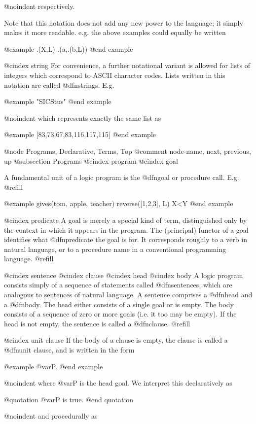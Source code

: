 {@noindent
respectively.

Note that this notation does not add any new power to the language; it
simply makes it more readable.  e.g. the above examples could equally be
written

@example
.(X,L)    .(a,.(b,L))
@end example

@cindex string
For convenience, a further notational variant is allowed for lists of
integers which correspond to ASCII character codes.  Lists written in this
notation are called @dfn{strings}.  E.g.

@example
"SICStus"
@end example

@noindent
which represents exactly the same list as 

@example
[83,73,67,83,116,117,115]
@end example

@node Programs, Declarative, Terms, Top
@comment  node-name,  next,  previous,  up
@subsection Programs
@cindex program
@cindex goal

A fundamental unit of a logic program is the @dfn{goal} or procedure call.
E.g. @refill

@example
gives(tom, apple, teacher)   reverse([1,2,3], L)   X<Y
@end example

@cindex predicate
A goal is merely a special kind of term, distinguished only by the
context in which it appears in the program.  The (principal) functor of
a goal identifies what @dfn{predicate} the goal is for.  It corresponds
roughly to a verb in natural language, or to a procedure name in a
conventional programming language. @refill

@cindex sentence
@cindex clause
@cindex head
@cindex body
A logic program consists simply of a sequence of statements called
@dfn{sentences}, which are analogous to sentences of natural language.  A
sentence comprises a @dfn{head} and a @dfn{body}.  The head either consists
of a single goal or is empty.  The body consists of a sequence of zero or
more goals (i.e. it too may be empty).  If the head is not empty, the
sentence is called a @dfn{clause}. @refill

@cindex unit clause
If the body of a clause is empty, the clause is called a @dfn{unit
clause}, and is written in the form

@example
@var{P}.
@end example

@noindent
where @var{P} is the head goal.  We interpret this declaratively as

@quotation
@var{P} is true.
@end quotation

@noindent
and procedurally as 

}
